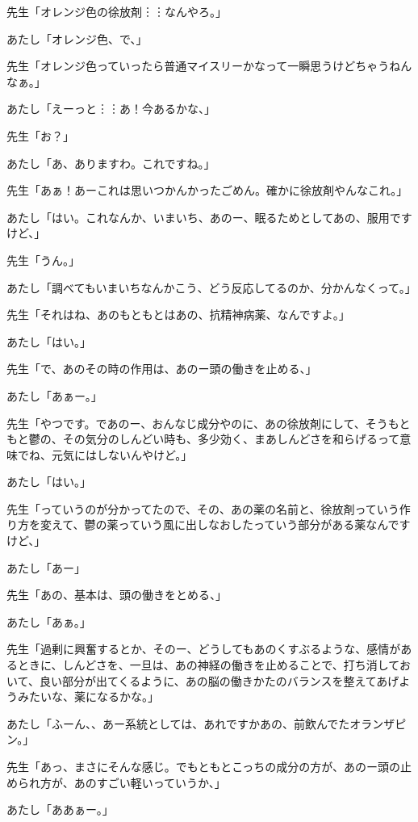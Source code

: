 \documentclass[b5j,twoside,twocolumn]{utarticle}
\begin{document}
\begin{description}
\item 先生「オレンジ色の徐放剤︙︙なんやろ。」
\item あたし「オレンジ色、で、」
\item 先生「オレンジ色っていったら普通マイスリーかなって一瞬思うけどちゃうねんなぁ。」
\item あたし「えーっと︙︙あ！今あるかな、」
\item 先生「お？」
\item あたし「あ、ありますわ。これですね。」
\item 先生「あぁ！あーこれは思いつかんかったごめん。確かに徐放剤やんなこれ。」
\item あたし「はい。これなんか、いまいち、あのー、眠るためとしてあの、服用ですけど、」
\item 先生「うん。」
\item あたし「調べてもいまいちなんかこう、どう反応してるのか、分かんなくって。」
\item 先生「それはね、あのもともとはあの、抗精神病薬、なんですよ。」
\item あたし「はい。」
\item 先生「で、あのその時の作用は、あのー頭の働きを止める、」
\item あたし「あぁー。」
\item 先生「やつです。であのー、おんなじ成分やのに、あの徐放剤にして、そうもともと鬱の、その気分のしんどい時も、多少効く、まあしんどさを和らげるって意味でね、元気にはしないんやけど。」
\item あたし「はい。」
\item 先生「っていうのが分かってたので、その、あの薬の名前と、徐放剤っていう作り方を変えて、鬱の薬っていう風に出しなおしたっていう部分がある薬なんですけど、」
\item あたし「あー」
\item 先生「あの、基本は、頭の働きをとめる、」
\item あたし「あぁ。」
\item 先生「過剰に興奮するとか、そのー、どうしてもあのくすぶるような、感情があるときに、しんどさを、一旦は、あの神経の働きを止めることで、打ち消しておいて、良い部分が出てくるように、あの脳の働きかたのバランスを整えてあげようみたいな、薬になるかな。」
\item あたし「ふーん、、あー系統としては、あれですかあの、前飲んでたオランザピン。」
\item 先生「あっ、まさにそんな感じ。でもともとこっちの成分の方が、あのー頭の止められ方が、あのすごい軽いっていうか、」
\item あたし「ああぁー。」

\end{description}
\end{document}
